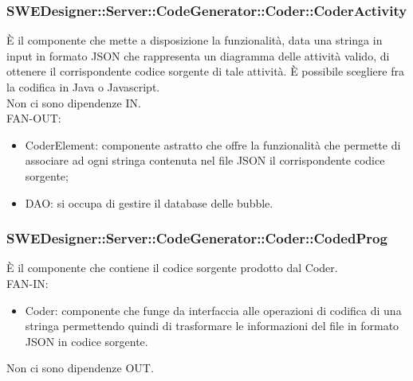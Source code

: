 \documentclass[../PianoDiQualifica.tex]{subfiles}
\begin{document}
		\subsubsection{SWEDesigner::Server::CodeGenerator::Coder::CoderActivity}
		È il componente che mette a disposizione la funzionalità, data una stringa in input in formato JSON che rappresenta un diagramma delle attività valido, di ottenere il corrispondente codice sorgente di tale attività. È possibile scegliere fra la codifica in Java o Javascript.\\
		Non ci sono dipendenze IN.\\
		FAN-OUT:
		\begin{itemize}
			\item CoderElement: componente astratto che offre la funzionalità che permette di associare ad ogni stringa contenuta nel file JSON il corrispondente codice sorgente;
			\item DAO: si occupa di gestire il database delle bubble.
		\end{itemize}
		\subsubsection{SWEDesigner::Server::CodeGenerator::Coder::CodedProg}
		È il componente che contiene il codice sorgente prodotto dal Coder.\\
		FAN-IN:
		\begin{itemize}
			\item Coder: componente che funge da interfaccia alle operazioni di codifica di una stringa permettendo quindi di trasformare le informazioni del file in formato JSON in codice sorgente.
		\end{itemize}
		Non ci sono dipendenze OUT.
		
\end{document}
